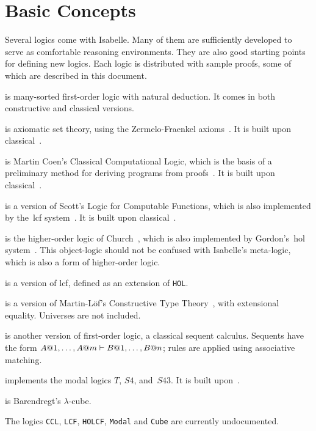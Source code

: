 \chapter{Basic Concepts}
Several logics come with Isabelle.  Many of them are sufficiently developed
to serve as comfortable reasoning environments.  They are also good
starting points for defining new logics.  Each logic is distributed with
sample proofs, some of which are described in this document.

\begin{ttdescription}
\item[\thydx{FOL}] is many-sorted first-order logic with natural
deduction.  It comes in both constructive and classical versions.

\item[\thydx{ZF}] is axiomatic set theory, using the Zermelo-Fraenkel
axioms~\cite{suppes72}.  It is built upon classical~\FOL{}.

\item[\thydx{CCL}] is Martin Coen's Classical Computational Logic,
  which is the basis of a preliminary method for deriving programs from
  proofs~\cite{coen92}.  It is built upon classical~\FOL{}.
 
\item[\thydx{LCF}] is a version of Scott's Logic for Computable
  Functions, which is also implemented by the~{\sc lcf}
  system~\cite{paulson87}.  It is built upon classical~\FOL{}.

\item[\thydx{HOL}] is the higher-order logic of Church~\cite{church40},
which is also implemented by Gordon's~{\sc hol} system~\cite{mgordon-hol}.
This object-logic should not be confused with Isabelle's meta-logic, which is
also a form of higher-order logic.

\item[\thydx{HOLCF}] is a version of {\sc lcf}, defined as an
  extension of {\tt HOL}\@.
 
\item[\thydx{CTT}] is a version of Martin-L\"of's Constructive Type
Theory~\cite{nordstrom90}, with extensional equality.  Universes are not
included.
 
\item[\thydx{LK}] is another version of first-order logic, a classical
sequent calculus.  Sequents have the form $A@1,\ldots,A@m\vdash
B@1,\ldots,B@n$; rules are applied using associative matching.

\item[\thydx{Modal}] implements the modal logics $T$, $S4$,
  and~$S43$.  It is built upon~\LK{}.

\item[\thydx{Cube}] is Barendregt's $\lambda$-cube.
\end{ttdescription}
The logics {\tt CCL}, {\tt LCF}, {\tt HOLCF}, {\tt Modal} and {\tt Cube}
are currently undocumented.

